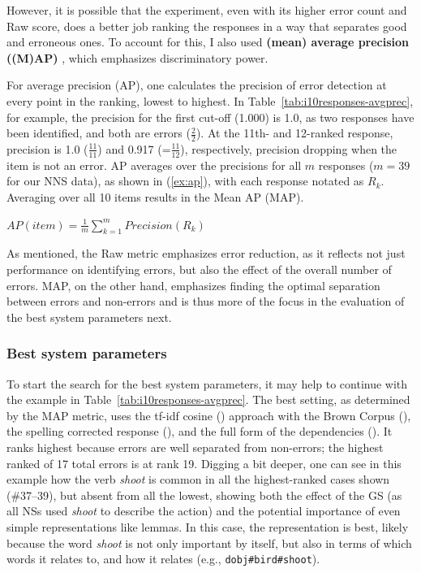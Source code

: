 However, it is possible that the  experiment, even with
its higher error count and Raw score, does a better job ranking the
responses in a way that separates good and erroneous ones. To account
for this, I also used \textbf{(mean) average precision ((M)AP)}
\citep[][ch. 8]{manning-et-al:08}, which emphasizes discriminatory
power.

For average precision (AP), one calculates the precision of error
detection at every point in the ranking, lowest to highest.  In
Table~\ref{tab:i10responses-avgprec}, for example, the precision for
the first cut-off (1.000) is 1.0, as two responses have been
identified, and both are errors ($\frac{2}{2}$). At the 11th- and
12-ranked response, precision is 1.0 ($\frac{11}{11}$) and 0.917
(=$\frac{11}{12}$), respectively, precision dropping when the item is
not an error.
AP averages over the precisions for all $m$ responses ($m=39$ for our
NNS data), as shown in (\ref{ex:ap}), with each response notated as
$R_k$.  Averaging over all 10 items results in the Mean AP (MAP).

\begin{exe}
\ex\label{ex:ap} $AP(item) = \frac{1}{m} \sum\limits_{k=1}^m
Precision(R_k)$
\end{exe}

As mentioned, the Raw metric emphasizes error reduction, as it
reflects not just performance on identifying errors, but also the
effect of the overall number of errors.
MAP, on the other hand, emphasizes finding the optimal separation
between errors and non-errors and is thus more of the focus in the
evaluation of the best system parameters next.

\subsubsection{Best system parameters} 

To start the search for the best system parameters, it may help to
continue with the example in
Table~\ref{tab:i10responses-avgprec}. The best setting, as determined by the
MAP metric, uses the tf-idf cosine () approach with the Brown Corpus (),
the spelling corrected response (), and the full form of
the dependencies (). It ranks highest because errors are
well separated from non-errors; the highest ranked of 17 total errors
is at rank 19.  Digging a bit deeper, one can see in this example how
the verb \textit{shoot} is common in all the highest-ranked cases shown
(\#37--39), but absent from all the lowest, showing both the effect of
the GS (as all NSs used \textit{shoot} to describe the action) and the
potential importance of even simple representations like lemmas.  In
this case, the  representation is best, likely because the
word \textit{shoot} is not only important by itself, but also in terms
of which words it relates to, and how it relates (e.g.,
\texttt{dobj\#bird\#shoot}).

